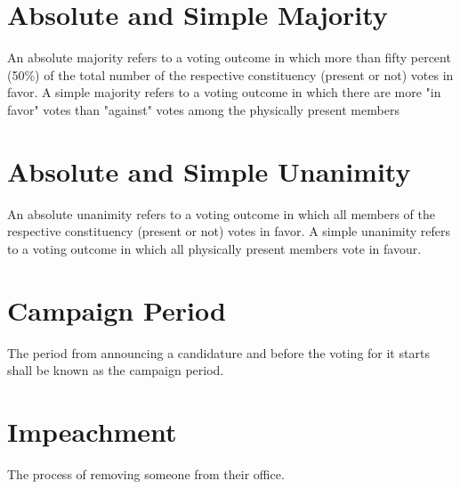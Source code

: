 \section{Absolute and Simple Majority}
An absolute majority refers to a voting outcome in which more than fifty percent (50\%) of the total number of the respective constituency (present or not) votes in favor.  A simple majority refers to a voting outcome in which there are more "in favor" votes than "against" votes among the physically present members

\section{Absolute and Simple Unanimity}
An absolute unanimity refers to a voting outcome in which all members of the respective constituency (present or not) votes in favor. A simple unanimity refers to a voting outcome in which all physically present members vote in favour.


\section{Campaign Period}
The period from announcing a candidature and before the voting for it starts shall be known as the campaign period.

\section{Impeachment}
The process of removing someone from their office.